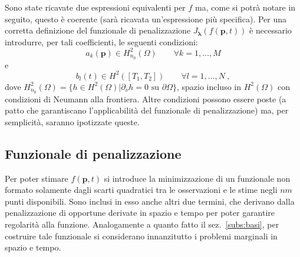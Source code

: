 \documentclass[a4paper,11pt,twoside,openright]{book}							%
\begin{document}
Sono state ricavate due espressioni equivalenti per $f$ ma, come si potrà notare in seguito, questo è coerente (sarà ricavata un'espressione più specifica). Per una corretta definizione del funzionale di penalizzazione $J_{\bm \lambda }(f(\bm p,t))$ è necessario introdurre, per tali coefficienti, le seguenti condizioni:
$$
a_k(\bm p) \in H_{n_0}^2(\Omega) \qquad \forall k=1, \ldots , M
$$
e
$$
b_l(t) \in H^2([T_1,T_2]) \qquad \forall l=1, \ldots , N \ ,
$$
dove $H^2_{n_0}(\Omega) = \{h \in H^2(\Omega) | \partial _{\nu}h=0 \mbox{ su } \partial \Omega\}$, spazio incluso in $H^2(\Omega)$ con condizioni di Neumann alla frontiera. Altre condizioni possono essere poste (a patto che garantiscano l'applicabilità del funzionale di penalizzazione) ma, per semplicità, saranno ipotizzate queste.


\subsection{Funzionale di penalizzazione}

Per poter stimare $f(\bm p,t)$ si introduce la minimizzazione di un funzionale non formato solamente dagli scarti quadratici tra le osservazioni e le stime negli $nm$ punti disponibili. Sono inclusi in esso anche altri due termini, che derivano dalla penalizzazione di opportune derivate in spazio e tempo per poter garantire regolarità alla funzione. Analogamente a quanto fatto il sez.~\ref{subs:basi}, per costruire tale funzionale si considerano innanzitutto i problemi marginali in spazio e tempo.
\end{document}
